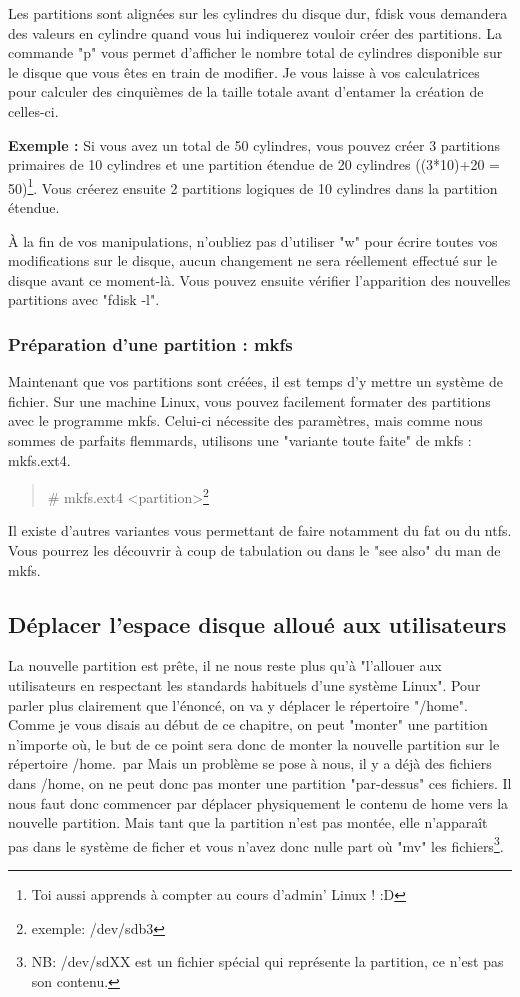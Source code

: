 \documentclass[a4paper,11pt]{article}
\newcommand{\commande}[1] {
    \begin{quote}
    \tt\raggedright #1
    \end{quote}
}
\begin{document}
\par Les partitions sont alignées sur les cylindres du disque dur, fdisk vous demandera des valeurs en cylindre quand vous lui indiquerez vouloir créer des partitions. La commande "p" vous permet d'afficher le nombre total de cylindres disponible sur le disque que vous êtes en train de modifier. Je vous laisse à vos calculatrices pour calculer des cinquièmes de la taille totale avant d'entamer la création de celles-ci.
\par \textbf{Exemple :} Si vous avez un total de 50 cylindres, vous pouvez créer 3 partitions primaires de 10 cylindres et une partition étendue de 20 cylindres ((3*10)+20 = 50)\footnote{Toi aussi apprends à compter au cours d'admin' Linux ! :D}. Vous créerez ensuite 2 partitions logiques de 10 cylindres dans la partition étendue.
\par À la fin de vos manipulations, n'oubliez pas d'utiliser "w" pour écrire toutes vos modifications sur le disque, aucun changement ne sera réellement effectué sur le disque avant ce moment-là. Vous pouvez ensuite vérifier l'apparition des nouvelles partitions avec "fdisk -l".

\subsubsection{Préparation d'une partition : mkfs}
\par Maintenant que vos partitions sont créées, il est temps d'y mettre un système de fichier. Sur une machine Linux, vous pouvez facilement formater des partitions avec le programme mkfs. Celui-ci nécessite des paramètres, mais comme nous sommes de parfaits flemmards, utilisons une "variante toute faite" de mkfs : mkfs.ext4.
\commande{\# mkfs.ext4 <partition>\footnote{exemple: /dev/sdb3}}
\par Il existe d'autres variantes vous permettant de faire notamment du fat ou du ntfs. Vous pourrez les découvrir à coup de tabulation ou dans le "see also" du man de mkfs.

\subsection{Déplacer l'espace disque alloué aux utilisateurs}
\par La nouvelle partition est prête, il ne nous reste plus qu'à "l'allouer aux utilisateurs en respectant les standards habituels d'une système Linux". Pour parler plus clairement que l'énoncé, on va y déplacer le répertoire "/home". Comme je vous disais au début de ce chapitre, on peut "monter" une partition n'importe où, le but de ce point sera donc de monter la nouvelle partition sur le répertoire /home.
\,par Mais un problème se pose à nous, il y a déjà des fichiers dans /home, on ne peut donc pas monter une partition "par-dessus" ces fichiers. Il nous faut donc commencer par déplacer physiquement le contenu de home vers la nouvelle partition. Mais tant que la partition n'est pas montée, elle n'apparaît pas dans le système de ficher et vous n'avez donc nulle part où "mv" les fichiers\footnote{NB: /dev/sdXX est un fichier spécial qui représente la partition, ce n'est pas son contenu.}.
\end{document}
